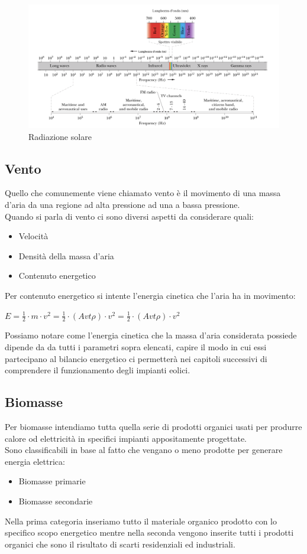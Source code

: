 \begin{figure}[H]
    \centering
    \includegraphics[width=1\textwidth]{res/luce_dettagli.png}
    \caption{Radiazione solare}
\end{figure}

\subsection{Vento}

Quello che comunemente viene chiamato vento è il movimento di una massa d'aria da una regione ad alta pressione ad una a bassa pressione.\\
Quando si parla di vento ci sono diversi aspetti da considerare quali:
\begin{itemize}
    \item Velocità
    \item Densità della massa d'aria
    \item Contenuto energetico
\end{itemize}
\noindent 
Per contenuto energetico si intente l'energia cinetica che l'aria ha in movimento:
\begin{center}
    \large{\(E=\frac{1}{2}\cdot m\cdot v^2 = \frac{1}{2} \cdot(Avt\rho)\cdot v^2 = \frac{1}{2} \cdot(Avt\rho)\cdot v^2 \)}
\end{center}
\noindent
Possiamo notare come l'energia cinetica che la massa d'aria considerata possiede dipende da da tutti i parametri sopra elencati, capire il modo in cui essi partecipano al bilancio energetico ci permetterà nei capitoli successivi di comprendere il funzionamento degli impianti eolici.
\newpage
\subsection{Biomasse}
Per biomasse intendiamo tutta quella serie di prodotti organici usati per produrre calore od elettricità in specifici impianti appositamente progettate.\\
Sono classificabili in base al fatto che vengano o meno prodotte per generare energia elettrica\cite{IRENA}:
\begin{itemize}
    \item Biomasse primarie
    \item Biomasse secondarie
\end{itemize}
\noindent
Nella prima categoria inseriamo tutto il materiale organico prodotto con lo specifico scopo energetico mentre nella seconda vengono inserite tutti i prodotti organici che sono il risultato di scarti residenziali ed industriali.

